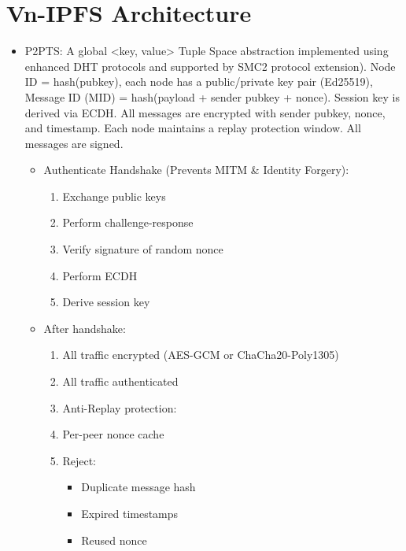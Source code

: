 \documentclass[conference]{IEEEtran}
\begin{document}
\section{Vn-IPFS Architecture }\label{AA}
\begin{itemize}
    \item P2PTS: A global \textless{}key, value\textgreater{} Tuple Space abstraction implemented using enhanced DHT protocols and supported by SMC2 protocol extension). Node ID = hash(pubkey), each node has a public/private key pair (Ed25519), Message ID (MID) = hash(payload + sender pubkey + nonce). Session key is derived via ECDH. All messages are encrypted with sender pubkey, nonce, and timestamp. Each node maintains a replay protection window. All messages are signed.

    \begin{itemize}
        \item Authenticate Handshake (Prevents MITM \& Identity Forgery):
        \begin{enumerate}
            \item Exchange public keys
            \item Perform challenge-response
            \item Verify signature of random nonce
            \item Perform ECDH
            \item Derive session key
        \end{enumerate}

        \item After handshake:
        \begin{enumerate}
            \item All traffic encrypted (AES-GCM or ChaCha20-Poly1305)
            \item All traffic authenticated
            \item Anti-Replay protection:
            \item Per-peer nonce cache
            \item Reject:
            \begin{itemize}
                \item Duplicate message hash
                \item Expired timestamps
                \item Reused nonce
            \end{itemize}
        \end{enumerate}
    \end{itemize}


\end{itemize}
\end{document}
